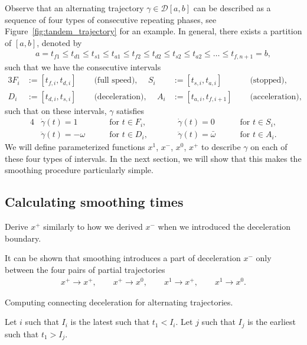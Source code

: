 \documentclass[a4paper]{article}
\theoremstyle{definition}
\theoremstyle{plain}
\begin{document}
Observe that an alternating trajectory $\gamma \in \mathcal{D}[a,b]$ can be described
as a sequence of four types of consecutive repeating phases, see
Figure~\ref{fig:tandem_trajectory} for an example.
%
In general, there exists a partition of $[a,b]$, denoted by
\begin{align*}
  a = t_{f1} \leq t_{d1} \leq t_{s1} \leq t_{a1} \leq t_{f2} \leq t_{d2} \leq t_{s2} \leq t_{a2} \leq \dots \leq t_{f,n+1} = b,
\end{align*}
such that we have the consecutive intervals
\begin{alignat*}{3}
  F_{i} &:= [t_{f,i}, t_{d,i}] \quad &\text{ (full speed), } \quad
  S_{i} &:= [t_{s,i}, t_{a,i}] \quad &\text{ (stopped), } \\
  D_{i} &:= [t_{d,i}, t_{s,i}] \quad &\text{ (deceleration), } \quad
  A_{i} &:= [t_{a,i}, t_{f,i+1}] \quad  &\text{ (acceleration), }
\end{alignat*}
%
such that on these intervals, $\gamma$ satisfies
%
\begin{alignat*}{4}
  &\dot{\gamma}(t) = 1 && \text{ for } t \in F_{i} , \quad \quad
  &&\dot{\gamma}(t) = 0 && \text{ for } t \in S_{i} ,\\
  &\ddot{\gamma}(t) = -\omega \quad && \text{ for } t \in D_{i} , \quad \quad
  &&\ddot{\gamma}(t) = \bar{\omega} \quad && \text{ for } t \in A_{i} .
\end{alignat*}
%
We will define parameterized functions $x^{1}$, $x^{-}$, $x^{0}$, $x^{+}$ to
describe $\gamma$ on each of these four types of intervals.
%
In the next section, we will show that this makes the smoothing procedure
particularly simple.

\subsection{Calculating smoothing times}

{\color{Navy}Derive $x^{+}$ similarly to how we derived $x^{-}$ when we
  introduced the deceleration boundary.}

It can be shown that smoothing introduces a part of deceleration $x^{-}$ only
between the four pairs of partial trajectories
\begin{align*}
    x^{+} \rightarrow x^{+} , \quad \quad
    x^{+} \rightarrow x^{0} , \quad \quad
    x^{1} \rightarrow x^{+} , \quad \quad
    x^{1} \rightarrow x^{0} .
\end{align*}
%

\begin{algorithm}
  \caption{Computing connecting deceleration for alternating trajectories.}
    \label{alg:connecting}
    \begin{algorithmic}
      \State Let $i$ such that $I_{i}$ is the latest such that $t_{1} < I_{i}$.
      \State Let $j$ such that $I_{j}$ is the earliest such that $t_{1} > I_{j}$.
    \end{algorithmic}
\end{algorithm}
\end{document}
